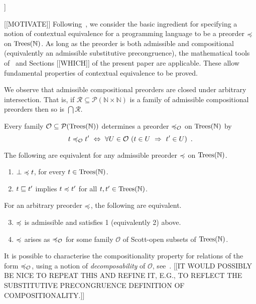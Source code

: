 \noindent
[[INSERT EASY PROOF (AT LEAST IN OUTLINE). IN PROOF NOTE THAT 1 ONLY REQUIRES REFLEXIVITY.]]


[[MOTIVATE]]
Following~\cite{gom}, we consider the basic ingredient for specifying  a notion of
contextual equivalence for a programming language to be a preorder $\preccurlyeq$ on $\textnormal{Trees}(\mathbb{N})$.
As long as the preorder is both admissible and compositional (equivalently an admissible substitutive precongruence), the mathematical tools of~\cite{gom} and Sections [[WHICH]] of the present paper are applicable. These allow fundamental properties of contextual equivalence to be proved.

We observe that admissible compositional preorders are closed under arbitrary intersection. That is, if
$\mathcal{R} \subseteq \mathcal{P}(\mathbb{N} \times \mathbb{N})$ is a family of admissible compositional preorders
then so is $\bigcap \mathcal{R}$.

Every family $\mathcal{O} \subseteq \mathcal{P}(\textnormal{Trees}(\mathbb{N}))$ determines a preorder $\preccurlyeq_\mathcal{O}$ on 
$\textnormal{Trees}(\mathbb{N})$ by
\begin{equation}
\label{equation:observational-preorder}
t \preccurlyeq_\mathcal{O} t' ~ \Leftrightarrow ~ \forall U \in \mathcal{O}~ (t \in U ~ \Rightarrow ~ t' \in U) \enspace .
\end{equation}

\begin{proposition} 
The following are equivalent for
any admissible  preorder  $\preccurlyeq$ on $\textnormal{Trees}(\mathbb{N})$.
\begin{enumerate} 
\item $\bot \preccurlyeq t$,  for every $t \in \textnormal{Trees}(\mathbb{N})$.
\item $t \sqsubseteq t'$ implies $t \preccurlyeq t'$ for all $t,t' \in \textnormal{Trees}(\mathbb{N})$.
\end{enumerate}
For an arbitrary preorder $\preccurlyeq$, the following are equivalent.
\begin{enumerate}
\setcounter{enumi}{2}
\item $\preccurlyeq$ is admissible and satisfies 1 (equivalently 2) above.
\item $\preccurlyeq$ arises as $\preccurlyeq_\mathcal{O}$ for some family $\mathcal{O}$ of Scott-open subsets
of $\textnormal{Trees}(\mathbb{N})$.
\end{enumerate}
\end{proposition}

It is possible to characterise the compositionality property for relations of the form $\preccurlyeq_\mathcal{O}$, using a notion of \emph{decomposability} of $\mathcal{O}$, see~\cite{gom}. 
[[IT WOULD POSSIBLY BE NICE TO REPEAT THIS AND REFINE IT, E.G., TO REFLECT THE SUBSTITUTIVE PRECONGRUENCE DEFINITION OF COMPOSITIONALITY.]]



